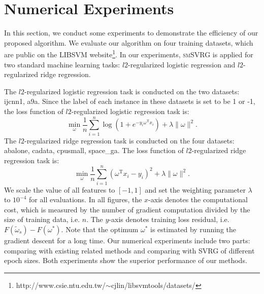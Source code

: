 \documentclass[conference]{IEEEtran}
\begin{document}
 \section{Numerical Experiments}
 \label{numexperiments}
 In this section, we conduct some experiments to demonstrate the efficiency of our proposed algorithm. We evaluate our algorithm on four training datasets, which are public on the LIBSVM website\footnote{http://www.csie.ntu.edu.tw/$\sim$cjlin/libsvmtools/datasets/}. In our experiments, \textsc{smSVRG} is applied for two standard machine learning tasks: $l2$-regularized logistic regression and $l2$-regularized ridge regression.
 
 The $l2$-regularized logistic regression task is conducted on the two datasets: ijcnn1, a9a. Since the label of each instance in these datasets is set to be 1 or -1, the loss function of $l2$-regularized logistic regression task is:
\begin{equation}
\label{logistic_reg}
\min\limits_\omega \frac{1}{n}\sum\limits_{i=1}^n \log(1+e^{-y_i \omega^\mathrm{T} x_i }) + \lambda \parallel \omega \parallel^2.
\end{equation}
The $l2$-regularized ridge regression task is conducted on the four datasets: abalone, cadata, cpusmall, space\_ga. The loss function of $l2$-regularized ridge regression task is:
\begin{equation}
\label{ridge_reg}
\min\limits_\omega \frac{1}{n}\sum\limits_{i=1}^n\left(\omega^{\mathrm{T}}x_i-y_i\right)^2 + \lambda \parallel \omega \parallel^2.
\end{equation}
We scale the value of all features to $[-1,1]$ and set the weighting parameter $\lambda$ to $10^{-4}$ for all evaluations. 
In all figures, the $x$-axis denotes the computational cost, which is measured by the number of gradient computation divided by the size of training data, i.e. $n$. The $y$-axis denotes training loss residual, i.e. $F(\tilde{\omega}_s) - F(\omega^{*})$. Note that the optimum $\omega^*$ is estimated by running the gradient descent for a long time. Our numerical experiments include two parts: comparing with existing related methods and comparing with SVRG of different epoch sizes. Both experiments show the superior performance of our methods. 
\end{document}
